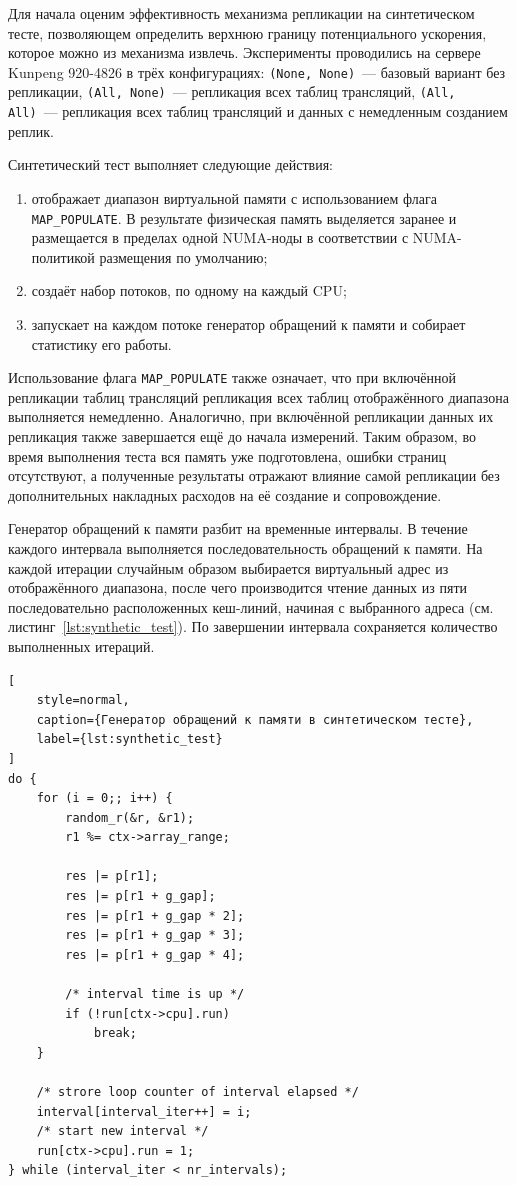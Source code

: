Для начала оценим эффективность механизма репликации на синтетическом тесте, позволяющем определить верхнюю границу потенциального ускорения, которое можно из механизма извлечь. Эксперименты проводились на сервере Kunpeng 920-4826 в трёх конфигурациях: \texttt{(None, None)}~--- базовый вариант без репликации, \texttt{(All, None)}~--- репликация всех таблиц трансляций, \texttt{(All, All)}~--- репликация всех таблиц трансляций и данных с немедленным созданием реплик.

Синтетический тест выполняет следующие действия:
\begin{enumerate}
	\item отображает диапазон виртуальной памяти с использованием флага \texttt{MAP\_POPULATE}. В результате физическая память выделяется заранее и размещается в пределах одной NUMA-ноды в соответствии с NUMA-политикой размещения по умолчанию;
	\item создаёт набор потоков, по одному на каждый CPU;
	\item запускает на каждом потоке генератор обращений к памяти и собирает статистику его работы.
\end{enumerate}

Использование флага \texttt{MAP\_POPULATE} также означает, что при включённой репликации таблиц трансляций репликация всех таблиц отображённого диапазона выполняется немедленно. Аналогично, при включённой репликации данных их репликация также завершается ещё до начала измерений. Таким образом, во время выполнения теста вся память уже подготовлена, ошибки страниц отсутствуют, а полученные результаты отражают влияние самой репликации без дополнительных накладных расходов на её создание и сопровождение.

Генератор обращений к памяти разбит на временные интервалы. В течение каждого интервала выполняется последовательность обращений к памяти. На каждой итерации случайным образом выбирается виртуальный адрес из отображённого диапазона, после чего производится чтение данных из пяти последовательно расположенных кеш-линий, начиная с выбранного адреса (см. листинг~\ref{lst:synthetic_test}). По завершении интервала сохраняется количество выполненных итераций.

\begin{lstlisting}[
	style=normal,
	caption={Генератор обращений к памяти в синтетическом тесте},
	label={lst:synthetic_test}
]
do {
	for (i = 0;; i++) {
		random_r(&r, &r1);
		r1 %= ctx->array_range;

		res |= p[r1];
		res |= p[r1 + g_gap];
		res |= p[r1 + g_gap * 2];
		res |= p[r1 + g_gap * 3];
		res |= p[r1 + g_gap * 4];

		/* interval time is up */
		if (!run[ctx->cpu].run)
			break;
	}

	/* strore loop counter of interval elapsed */
	interval[interval_iter++] = i;
	/* start new interval */
	run[ctx->cpu].run = 1;
} while (interval_iter < nr_intervals);
\end{lstlisting}

